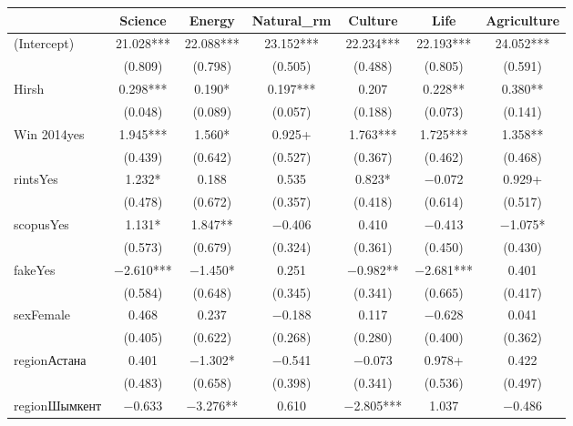 \begin{table}
\centering
\begin{tabular}[t]{lcccccc}
\toprule
  & Science & Energy & Natural\_rm & Culture & Life & Agriculture\\
\midrule
(Intercept) & \num{21.028}*** & \num{22.088}*** & \num{23.152}*** & \num{22.234}*** & \num{22.193}*** & \num{24.052}***\\
 & (\num{0.809}) & (\num{0.798}) & (\num{0.505}) & (\num{0.488}) & (\num{0.805}) & (\num{0.591})\\
Hirsh & \num{0.298}*** & \num{0.190}* & \num{0.197}*** & \num{0.207} & \num{0.228}** & \num{0.380}**\\
 & (\num{0.048}) & (\num{0.089}) & (\num{0.057}) & (\num{0.188}) & (\num{0.073}) & (\num{0.141})\\
Win 2014yes & \num{1.945}*** & \num{1.560}* & \num{0.925}+ & \num{1.763}*** & \num{1.725}*** & \num{1.358}**\\
 & (\num{0.439}) & (\num{0.642}) & (\num{0.527}) & (\num{0.367}) & (\num{0.462}) & (\num{0.468})\\
rintsYes & \num{1.232}* & \num{0.188} & \num{0.535} & \num{0.823}* & \num{-0.072} & \num{0.929}+\\
 & (\num{0.478}) & (\num{0.672}) & (\num{0.357}) & (\num{0.418}) & (\num{0.614}) & (\num{0.517})\\
scopusYes & \num{1.131}* & \num{1.847}** & \num{-0.406} & \num{0.410} & \num{-0.413} & \num{-1.075}*\\
 & (\num{0.573}) & (\num{0.679}) & (\num{0.324}) & (\num{0.361}) & (\num{0.450}) & (\num{0.430})\\
fakeYes & \num{-2.610}*** & \num{-1.450}* & \num{0.251} & \num{-0.982}** & \num{-2.681}*** & \num{0.401}\\
 & (\num{0.584}) & (\num{0.648}) & (\num{0.345}) & (\num{0.341}) & (\num{0.665}) & (\num{0.417})\\
sexFemale & \num{0.468} & \num{0.237} & \num{-0.188} & \num{0.117} & \num{-0.628} & \num{0.041}\\
 & (\num{0.405}) & (\num{0.622}) & (\num{0.268}) & (\num{0.280}) & (\num{0.400}) & (\num{0.362})\\
regionАстана & \num{0.401} & \num{-1.302}* & \num{-0.541} & \num{-0.073} & \num{0.978}+ & \num{0.422}\\
 & (\num{0.483}) & (\num{0.658}) & (\num{0.398}) & (\num{0.341}) & (\num{0.536}) & (\num{0.497})\\
regionШымкент & \num{-0.633} & \num{-3.276}** & \num{0.610} & \num{-2.805}*** & \num{1.037} & \num{-0.486}\\

\end{tabular}
\end{table}
